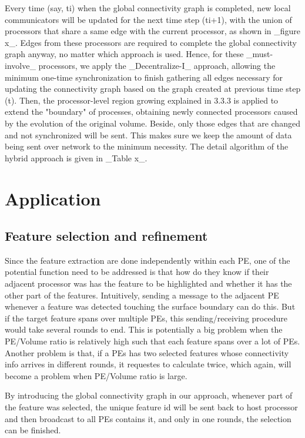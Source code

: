 \documentclass[10pt, conference, compsocconf]{IEEEtran}
\begin{document}
Every time (say, ti) when the global connectivity graph is completed, new local communicators will be updated for the next time step (ti+1), with the union of processors that share a same edge with the current processor, as shown in _figure x_. Edges from these processors are required to complete the global connectivity graph anyway, no matter which approach is used. Hence, for these _must-involve_ processors, we apply the _Decentralize-I_ approach, allowing the minimum one-time synchronization to finish gathering all edges necessary for updating the connectivity graph based on the graph created at previous time step (t). Then, the processor-level region growing explained in 3.3.3 is applied to extend the "boundary" of processes, obtaining newly connected processors caused by the evolution of the original volume. Beside, only those edges that are changed and not synchronized will be sent. This makes sure we keep the amount of data being sent over network to the minimum necessity.
The detail algorithm of the hybrid approach is given in _Table x_.

\section{Application}

\subsection{Feature selection and refinement}
Since the feature extraction are done independently within each PE, one of the potential function need to be addressed is that how do they know if their adjacent processor was has the feature to be highlighted and whether it has the other part of the features. Intuitively, sending a message to the adjacent PE whenever a feature was detected touching the surface boundary can do this. But if the target feature spans over multiple PEs, this sending/receiving procedure would take several rounds to end. This is potentially a big problem when the PE/Volume ratio is relatively high such that each feature spans over a lot of PEs. Another problem is that, if a PEs has two selected features whose connectivity info arrives in different rounds, it requestes to calculate twice, which again, will become a problem when PE/Volume ratio is large.

By introducing the global connectivity graph in our approach, whenever part of the feature was selected, the unique feature id will be sent back to host processor and then broadcast to all PEs contains it, and only in one rounds, the selection can be finished.
\end{document}
